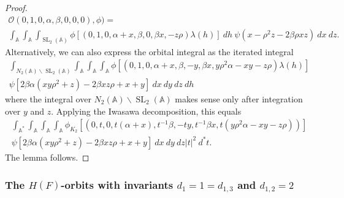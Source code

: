 \documentclass[12pt]{amsart}
\newcommand{\abs}[1]{\left|{#1}\right|}
\newcommand{\SL}{\operatorname{SL}}
\newcommand{\A}{\mathbb{A}}
\newcommand{\bs}{\backslash}
\renewcommand{\O}{\mathcal{O}}
\theoremstyle{remark}
\begin{document}
\begin{proof}
\begin{multline*}
\O(0,1,0,\alpha,\beta,0,0,0),\phi)=\\ \int_\A\int_\A\int_{\SL_2(\A)} \phi[(0,1,0, \alpha+x,\beta,0,\beta x,-z\rho)\lambda(h)]\ dh\ \psi(x-\rho^2 z-2\beta\rho xz)\ dx\ dz.
\end{multline*}
Alternatively, we can also express the orbital integral as the iterated integral
\begin{multline*}
\int_{N_2(\A)\bs \SL_2(\A)} \int_\A\int_\A\int_\A \phi[(0,1,0,\alpha+x,\beta,-y,\beta x,y\rho^2\alpha-xy-z\rho) \lambda(h)]\\ \psi[2\beta\alpha (xy\rho^2+z)-2\beta xz\rho+x+y] \ dx\ dy\ dz\ dh
\end{multline*}
where the integral over ${N_2(\A)\bs \SL_2(\A)}$ makes sense only after integration over $y$ and $z$. 
Applying the Iwasawa decomposition, this equals
\begin{multline*}
\int_{\A^*}\int_\A\int_\A\int_\A \phi_{K_2}[(0,t,0,t(\alpha+x),t^{-1}\beta,-ty,t^{-1}\beta x,t(y\rho^2\alpha-xy-z\rho))]\\ \psi[2\beta\alpha (xy\rho^2+z)-2\beta xz\rho+x+y] \ dx\ dy\ dz\abs{t}^2\ d^*t.
\end{multline*}
The lemma follows.


\end{proof}



\subsubsection{The $H(F)$-orbits with invariants $d_1=1=d_{1,3}$ and $d_{1,2}=2$}
\end{document}
